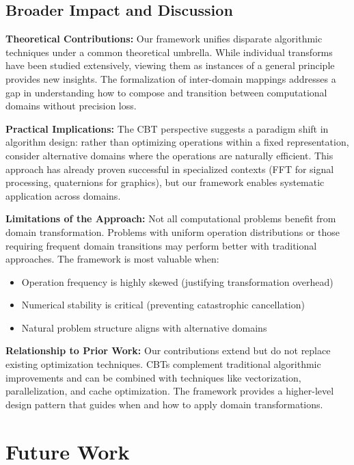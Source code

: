 \documentclass[11pt]{article}
\theoremstyle{definition}
\begin{document}
\subsection{Broader Impact and Discussion}

\textbf{Theoretical Contributions:}
Our framework unifies disparate algorithmic techniques under a common theoretical umbrella. While individual transforms have been studied extensively, viewing them as instances of a general principle provides new insights. The formalization of inter-domain mappings addresses a gap in understanding how to compose and transition between computational domains without precision loss.

\textbf{Practical Implications:}
The CBT perspective suggests a paradigm shift in algorithm design: rather than optimizing operations within a fixed representation, consider alternative domains where the operations are naturally efficient. This approach has already proven successful in specialized contexts (FFT for signal processing, quaternions for graphics), but our framework enables systematic application across domains.

\textbf{Limitations of the Approach:}
Not all computational problems benefit from domain transformation. Problems with uniform operation distributions or those requiring frequent domain transitions may perform better with traditional approaches. The framework is most valuable when:
\begin{itemize}
\item Operation frequency is highly skewed (justifying transformation overhead)
\item Numerical stability is critical (preventing catastrophic cancellation)
\item Natural problem structure aligns with alternative domains
\end{itemize}

\textbf{Relationship to Prior Work:}
Our contributions extend but do not replace existing optimization techniques. CBTs complement traditional algorithmic improvements and can be combined with techniques like vectorization, parallelization, and cache optimization. The framework provides a higher-level design pattern that guides when and how to apply domain transformations.

\section{Future Work}
\label{sec:future}
\end{document}
